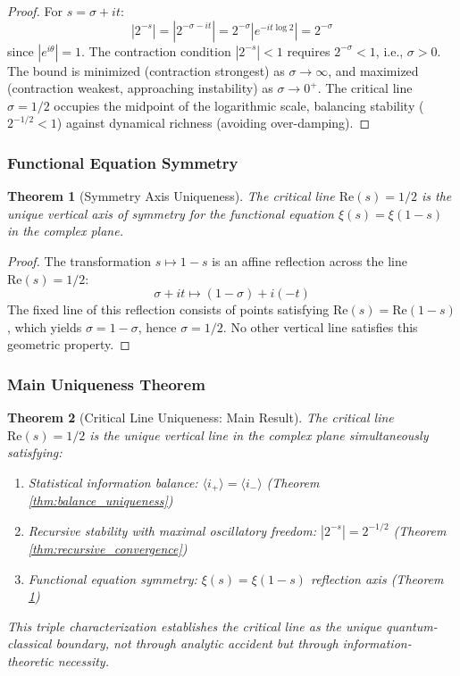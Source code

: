 \documentclass[12pt]{article}
\theoremstyle{plain}
\newtheorem{theorem}{Theorem}[section]
\theoremstyle{definition}
\begin{document}
\begin{proof}
For $s = \sigma + it$:
$$|2^{-s}| = |2^{-\sigma-it}| = 2^{-\sigma} |e^{-it\log 2}| = 2^{-\sigma}$$
since $|e^{i\theta}| = 1$. The contraction condition $|2^{-s}| < 1$ requires $2^{-\sigma} < 1$, i.e., $\sigma > 0$. The bound is minimized (contraction strongest) as $\sigma \to \infty$, and maximized (contraction weakest, approaching instability) as $\sigma \to 0^+$. The critical line $\sigma = 1/2$ occupies the midpoint of the logarithmic scale, balancing stability ($2^{-1/2} < 1$) against dynamical richness (avoiding over-damping).
\end{proof}

\subsubsection{Functional Equation Symmetry}

\begin{theorem}[Symmetry Axis Uniqueness]\label{thm:symmetry_axis}
The critical line $\text{Re}(s) = 1/2$ is the unique vertical axis of symmetry for the functional equation $\xi(s) = \xi(1-s)$ in the complex plane.
\end{theorem}

\begin{proof}
The transformation $s \mapsto 1-s$ is an affine reflection across the line $\text{Re}(s) = 1/2$:
$$\sigma + it \mapsto (1-\sigma) + i(-t)$$
The fixed line of this reflection consists of points satisfying $\text{Re}(s) = \text{Re}(1-s)$, which yields $\sigma = 1 - \sigma$, hence $\sigma = 1/2$. No other vertical line satisfies this geometric property.
\end{proof}

\subsubsection{Main Uniqueness Theorem}

\begin{theorem}[Critical Line Uniqueness: Main Result]\label{thm:main_uniqueness}
The critical line $\text{Re}(s) = 1/2$ is the unique vertical line in the complex plane simultaneously satisfying:
\begin{enumerate}
\item Statistical information balance: $\langle i_+ \rangle = \langle i_- \rangle$ (Theorem \ref{thm:balance_uniqueness})
\item Recursive stability with maximal oscillatory freedom: $|2^{-s}| = 2^{-1/2}$ (Theorem \ref{thm:recursive_convergence})
\item Functional equation symmetry: $\xi(s) = \xi(1-s)$ reflection axis (Theorem \ref{thm:symmetry_axis})
\end{enumerate}
This triple characterization establishes the critical line as the unique quantum-classical boundary, not through analytic accident but through information-theoretic necessity.
\end{theorem}
\end{document}
